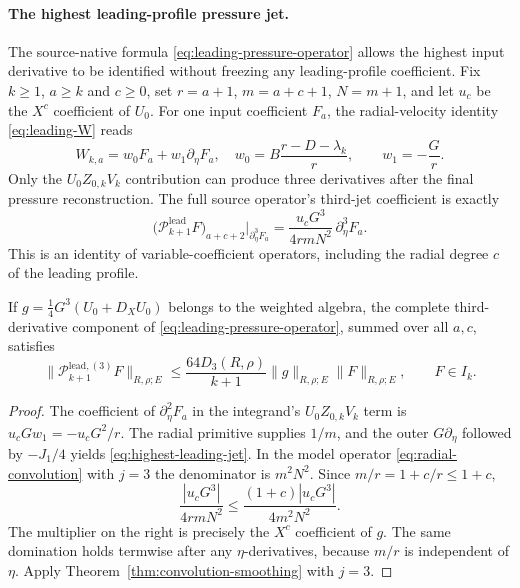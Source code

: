 \paragraph{The highest leading-profile pressure jet.}
The source-native formula \eqref{eq:leading-pressure-operator} allows the highest input derivative to be identified without freezing any leading-profile coefficient. Fix $k\ge1$, $a\ge k$ and $c\ge0$, set $r=a+1$, $m=a+c+1$, $N=m+1$, and let $u_c$ be the $X^c$ coefficient of $U_0$. For one input coefficient $F_a$, the radial-velocity identity \eqref{eq:leading-W} reads
\[
 W_{k,a}=w_0F_a+w_1\partial_\eta F_a,\quad
 w_0=B\frac{r-D-\lambda_k}{r},\qquad w_1=-\frac Gr.
\]
Only the $U_0Z_{0,k}V_k$ contribution can produce three derivatives after the final pressure reconstruction. The full source operator's third-jet coefficient is exactly
\begin{equation}\label{eq:highest-leading-jet}
 \bigl(\mathcal P_{k+1}^{\mathrm{lead}}F\bigr)_{a+c+2}\big|_{\partial_\eta^3F_a}
 =\frac{u_cG^3}{4r m N^2}\,\partial_\eta^3F_a.
\end{equation}
This is an identity of variable-coefficient operators, including the radial degree $c$ of the leading profile.

\begin{corollary}\label{cor:leading-highest}
If $g=\tfrac14G^3(U_0+D_XU_0)$ belongs to the weighted algebra, the complete third-derivative component of \eqref{eq:leading-pressure-operator}, summed over all $a,c$, satisfies
\[
 \|\mathcal P_{k+1}^{\mathrm{lead},(3)}F\|_{R,\rho;E}
 \le\frac{64D_3(R,\rho)}{k+1}\|g\|_{R,\rho;E}\|F\|_{R,\rho;E},\qquad F\in I_k.
\]
\end{corollary}
\begin{proof}
The coefficient of $\partial_\eta^2F_a$ in the integrand's $U_0Z_{0,k}V_k$ term is $u_cGw_1=-u_cG^2/r$. The radial primitive supplies $1/m$, and the outer $G\partial_\eta$ followed by $-J_1/4$ yields \eqref{eq:highest-leading-jet}. In the model operator \eqref{eq:radial-convolution} with $j=3$ the denominator is $m^2N^2$. Since $m/r=1+c/r\le1+c$,
\[
 \frac{|u_cG^3|}{4rmN^2}
 \le\frac{(1+c)|u_cG^3|}{4m^2N^2}.
\]
The multiplier on the right is precisely the $X^c$ coefficient of $g$. The same domination holds termwise after any $\eta$-derivatives, because $m/r$ is independent of $\eta$. Apply Theorem~\ref{thm:convolution-smoothing} with $j=3$.
\end{proof}

